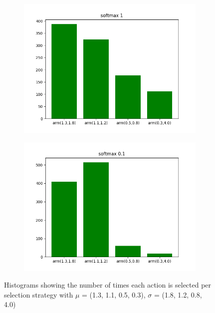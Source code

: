 \documentclass[letterpaper]{article}
\begin{document}
\begin{figure}[H]
\begin{subfigure}{.5\textwidth}
    \includegraphics[width=1\linewidth]{images/assign3/ex2/arms_softmax1}
    \caption{}
    \label{fig:arms_softmax1_ex2}
  \end{subfigure}
  \begin{subfigure}{.5\textwidth}
    \centering
    \includegraphics[width=1\linewidth]{images/assign3/ex2/arms_softmax01}
    \caption{}
    \label{fig:arms_softmax01_ex2}
  \end{subfigure}
    \caption{Histograms showing the number of times each action is selected
    per selection strategy with
    $\mu$ = (1.3, 1.1, 0.5, 0.3), $\sigma$ = (1.8, 1.2, 0.8, 4.0)}
    \label{fig:arms_ex2}
\end{figure}
\end{document}
